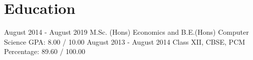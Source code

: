 \section{Education}\label{sec:education}
\resumeSubHeadingListStart
{} {August 2014 - August 2019} {M.Sc. (Hons) Economics and B.E.(Hons) Computer Science} {GPA: 8.00 / 10.00}
 {August 2013 - August 2014} {Class XII, CBSE, PCM} {Percentage: 89.60 / 100.00}
\resumeSubHeadingListEnd